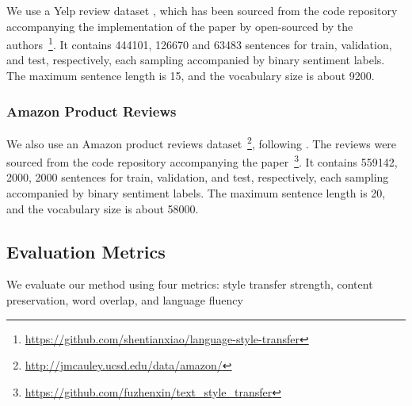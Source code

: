 \documentclass[11pt,a4paper]{article}
\begin{document}
We use a Yelp review dataset \citep{challenge2013yelp}, which has been sourced from the code repository accompanying the implementation of the paper by \cite{shen2017style} open-sourced by the authors~\footnote{\url{https://github.com/shentianxiao/language-style-transfer}}. It contains 444101, 126670 and 63483 sentences for train, validation, and test, respectively, each sampling accompanied by binary sentiment labels. The maximum sentence length is 15, and the vocabulary size is about 9200.

\subsubsection{Amazon Product Reviews}

We also use an Amazon product reviews dataset~\footnote{\url{http://jmcauley.ucsd.edu/data/amazon/}}, following \cite{fu2017style}. The reviews were sourced from the code repository accompanying the paper~\footnote{\url{https://github.com/fuzhenxin/text_style_transfer}}. It contains 559142, 2000, 2000 sentences for train, validation, and test, respectively, each sampling accompanied by binary sentiment labels. The maximum sentence length is 20, and the vocabulary size is about 58000.

\subsection{Evaluation Metrics}

We evaluate our method using four metrics: style transfer strength, content preservation, word overlap, and language fluency
\end{document}
